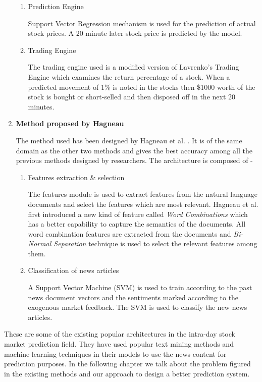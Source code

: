 \documentclass[a4paper,12bp]{report}
\begin{document}
\begin{enumerate}
\begin{enumerate}
\item Prediction Engine 

Support Vector Regression mechanism is used for the prediction of actual stock prices. A 20 minute later stock price is predicted by the model. 

\item Trading Engine

The trading engine used is a modified version of Lavrenko's Trading Engine \cite{lavrenko2000language} which examines the return percentage of a stock. When a predicted movement of 1\% is noted in the stocks then \$1000 worth of the stock is bought or short-selled and then disposed off in the next 20 minutes. 
\end{enumerate}

\item \textbf{Method proposed by Hagneau}

The method used has been designed by Hagneau et al. \cite{Hagenau:2013}. It is of the same domain as the other two methods and gives the best accuracy among all the previous methods designed by researchers. The architecture is composed of - 
\begin{enumerate}
\item Features extraction \& selection 

The features module is used to extract features from the natural language documents and select the features which are most relevant. Hagneau et al. first introduced a new kind of feature called \textit{Word Combinations} which has a better capability to capture the semantics of the documents. All word combination features are extracted from the documents and \textit{Bi-Normal Separation} technique is used to select the relevant features among them. 

\item Classification of news articles

A Support Vector Machine (SVM) is used to train according to the past news document vectors and the sentiments marked according to the exogenous market feedback. The SVM is used to classify the new news articles.

\end{enumerate}
\end{enumerate}

These are some of the existing popular architectures in the intra-day stock market prediction field. They have used popular text mining methods and machine learning techniques in their models to use the news content for prediction purposes. In the following chapter we talk about the problem figured in the existing methods and our approach to design a better prediction system. 
\end{document}
